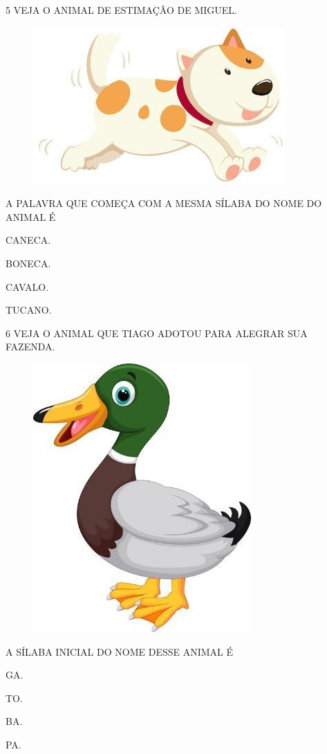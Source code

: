 \num{5} VEJA O ANIMAL DE ESTIMAÇÃO DE MIGUEL.

\begin{figure}[htpb]
\centering
\includegraphics[width=.55\textwidth]{media/image214.jpg}
\end{figure}

A PALAVRA QUE COMEÇA COM A MESMA SÍLABA DO NOME DO ANIMAL É 

\begin{escolha}
\item CANECA.

\item BONECA.

\item CAVALO.

\item TUCANO.
\end{escolha}

\pagebreak
\num{6} VEJA O ANIMAL QUE TIAGO ADOTOU PARA ALEGRAR SUA FAZENDA.

\begin{figure}[htpb]
\centering
\includegraphics[width=.3\textwidth]{media/image215.jpg}
\end{figure}

A SÍLABA INICIAL DO NOME DESSE ANIMAL É

\begin{escolha}
\item GA.

\item TO.

\item BA.

\item PA.
\end{escolha}

